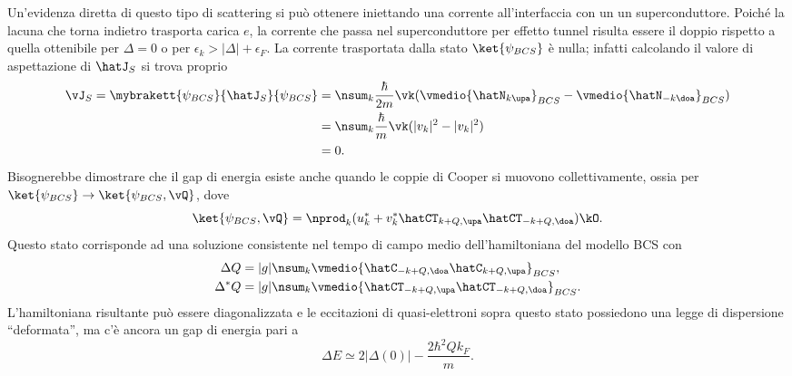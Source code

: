 Un'evidenza diretta di questo tipo di scattering si può ottenere iniettando una corrente all'interfaccia con un un superconduttore. Poiché la lacuna che torna indietro trasporta carica $e$, la corrente che passa nel superconduttore per effetto tunnel risulta essere il doppio rispetto a quella ottenibile per $\Delta = 0$ o per $\epsilon_k > |\Delta| + \epsilon_F$. La corrente trasportata dalla stato $\ket{\psi_{BCS}}$ è nulla; infatti calcolando il valore di aspettazione di $\hatJ_S$ si trova proprio
\begin{equation}
    \begin{split}
        \vJ_S = \mybrakett{\psi_{BCS}}{\hatJ_S}{\psi_{BCS}} &= \nsum_k\frac{\hbar}{2m}\vk(\vmedio{\hatN_{k\upa}}_{BCS} - \vmedio{\hatN_{-k\doa}}_{BCS}) \\
        &= \nsum_k\frac{\hbar}{m}\vk(|v_k|^2 - |v_k|^2) \\
        &= 0.
    \end{split}
\end{equation}
Bisognerebbe dimostrare che il gap di energia esiste anche quando le coppie di Cooper si muovono collettivamente, ossia per $\ket{\psi_{BCS}} \to \ket{\psi_{BCS},\vQ}$, dove 
\begin{equation}
    \ket{\psi_{BCS},\vQ} = \nprod_k(u_k^* + v_k^*\hatCT_{k + Q,\upa}\hatCT_{-k + Q,\doa})\kO.
\end{equation}
Questo stato corrisponde ad una soluzione consistente nel tempo di campo medio dell'hamiltoniana del modello BCS con 
\begin{align}
    \Delta Q &= |g|\nsum_k\vmedio{\hatC_{-k + Q,\doa}\hatC_{k + Q,\upa}}_{BCS}, \\
    \Delta^* Q &= |g|\nsum_k\vmedio{\hatCT_{-k + Q,\upa}\hatCT_{-k + Q,\doa}}_{BCS}.
\end{align}
L'hamiltoniana risultante può essere diagonalizzata e le eccitazioni di quasi-elettroni sopra questo stato possiedono una legge di dispersione ``deformata'', ma c'è ancora un gap di energia pari a 
\begin{equation}
    \Delta E \simeq 2|\Delta(0)| - \frac{2\hbar^2Qk_F}{m}.
\end{equation}